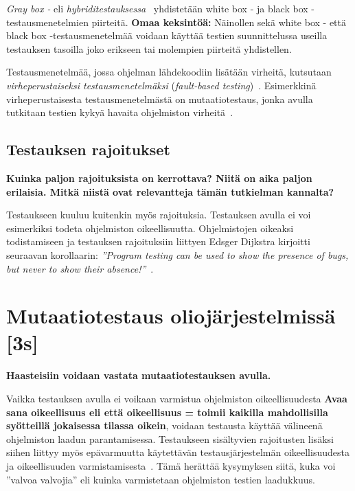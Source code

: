 \documentclass[finnish, grading]{tktltiki2}
\theoremstyle{definition}
\theoremstyle{remark}
\begin{document}
\textit{Gray box -} eli \textit{hybriditestauksessa}~\cite[s. 52]{Binder:1999} yhdistetään white box - ja black box -testausmenetelmien piirteitä. \textbf{Omaa keksintöä:} Näinollen sekä white box - että black box -testausmenetelmää voidaan käyttää testien suunnittelussa useilla testauksen tasoilla joko erikseen tai molempien piirteitä yhdistellen.

Testausmenetelmää, jossa ohjelman lähdekoodiin lisätään virheitä, kutsutaan \textit{virheperustaiseksi testausmenetelmäksi} (\textit{fault-based testing})~\cite[s. 52]{Binder:1999}. Esimerkkinä virheperustaisesta testausmenetelmästä on mutaatiotestaus, jonka avulla tutkitaan testien kykyä havaita ohjelmiston virheitä~\cite[s. X]{Joku mutaatiolähde}.


\subsection{Testauksen rajoitukset}

\textbf{Kuinka paljon rajoituksista on kerrottava? Niitä on aika paljon erilaisia. Mitkä niistä ovat relevantteja tämän tutkielman kannalta?}

Testaukseen kuuluu kuitenkin myös rajoituksia. Testauksen avulla ei voi esimerkiksi todeta ohjelmiston oikeellisuutta. Ohjelmistojen oikeaksi todistamiseen ja testauksen rajoituksiin liittyen Edsger Dijkstra kirjoitti seuraavan korollaarin: \textit{''Program testing can be used to show the presence of bugs, but never to show their absence!''}~\cite[s. 6]{Dahl:Dijkstra:Hoare:1972}. 

\section{Mutaatiotestaus oliojärjestelmissä [3s]}

\textbf{Haasteisiin voidaan vastata mutaatiotestauksen avulla.}

Vaikka testauksen avulla ei voikaan varmistua ohjelmiston oikeellisuudesta \textbf{Avaa sana oikeellisuus eli että oikeellisuus = toimii kaikilla mahdollisilla syötteillä jokaisessa tilassa oikein}, voidaan testausta käyttää välineenä ohjelmiston laadun parantamisessa. Testaukseen sisältyvien rajoitusten lisäksi siihen liittyy myös epävarmuutta käytettävän testausjärjestelmän oikeellisuudesta ja oikeellisuuden varmistamisesta~\cite[s. 209]{Manna:Waldinger:1978}. Tämä herättää kysymyksen siitä, kuka voi ''valvoa valvojia'' eli kuinka varmistetaan ohjelmiston testien laadukkuus.
\end{document}
